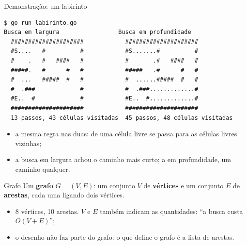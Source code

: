 \documentclass{beamer}
\begin{document}
\begin{frame}[fragile]{Demonstração: um labirinto}
	\begin{verbatim}
$ go run labirinto.go
Busca em largura                 Busca em profundidade
  #####################            #####################
  #S....   #          #            #S.......#          #
  #    .   #   ####   #            #       .#   ####   #
  #####.   #      #   #            #####   .#      #   #
  #  ...   #####  #   #            #  ......#####  #   #
  #  .###             #            #  .###.............#
  #E..  #             #            #E..  #.............#
  #####################            #####################
  13 passos, 43 células visitadas  45 passos, 48 células visitadas
\end{verbatim}

	\begin{itemize}
		\item a mesma regra nas duas: de uma célula livre se passa para as
		      células livres vizinhas;
		\item a busca em largura achou o caminho mais curto; a em profundidade,
		      um caminho qualquer.
	\end{itemize}
\end{frame}

\begin{frame}{Grafo}
	Um \textbf{grafo} $G = (V, E)$: um conjunto $V$ de \textbf{vértices} e um
	conjunto $E$ de \textbf{arestas}, cada uma ligando dois vértices.

	\begin{center}
		\scalebox{0.85}{\grafoG}
	\end{center}

	\begin{itemize}
		\item 8 vértices, 10 arestas. $V$ e $E$ também indicam as quantidades:
		      ``a busca custa $O(V + E)$'';
		\item o desenho não faz parte do grafo: o que define o grafo é a lista de
		      arestas.
	\end{itemize}
\end{frame}
\end{document}
